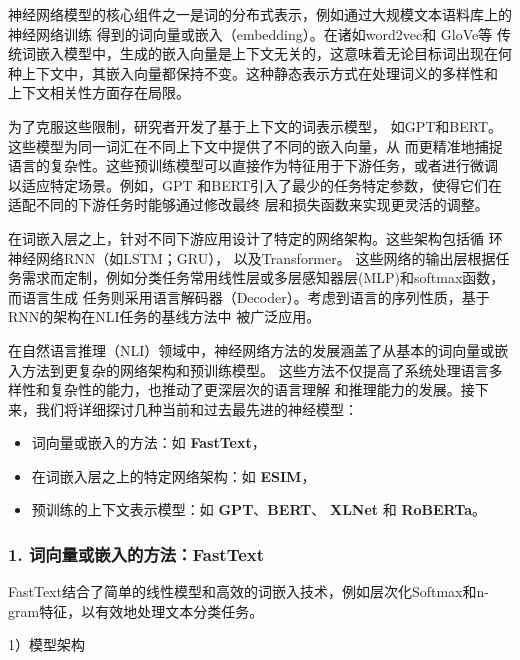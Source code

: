 神经网络模型的核心组件之一是词的分布式表示，例如通过大规模文本语料库上的神经网络训练
得到的词向量或嵌入（embedding）。在诸如word2vec\cite{mikolov2013distributed}和
GloVe\cite{pennington2014glove}等
传统词嵌入模型中，生成的嵌入向量是上下文无关的，这意味着无论目标词出现在何
种上下文中，其嵌入向量都保持不变。这种静态表示方式在处理词义的多样性和
上下文相关性方面存在局限。

为了克服这些限制，研究者开发了基于上下文的词表示模型，
如GPT\cite{radford2018improving}和BERT\cite{devlin2018bert}。
这些模型为同一词汇在不同上下文中提供了不同的嵌入向量，从
而更精准地捕捉语言的复杂性。这些预训练模型可以直接作为特征用于下游任务，或者进行微调
以适应特定场景。例如，GPT
和BERT引入了最少的任务特定参数，使得它们在适配不同的下游任务时能够通过修改最终
层和损失函数来实现更灵活的调整。

在词嵌入层之上，针对不同下游应用设计了特定的网络架构。这些架构包括循
环神经网络RNN（如LSTM\cite{hochreiter1997long}；GRU\cite{cho2014learning}），
以及Transformer\cite{vaswani2017attention}。
这些网络的输出层根据任务需求而定制，例如分类任务常用线性层或多层感知器层(MLP)和softmax函数，而语言生成
任务则采用语言解码器（Decoder）。考虑到语言的序列性质，基于RNN的架构在NLI任务的基线方法中
被广泛应用。

在自然语言推理（NLI）领域中，神经网络方法的发展涵盖了从基本的词向量或嵌入方法到更复杂的网络架构和预训练模型。
这些方法不仅提高了系统处理语言多样性和复杂性的能力，也推动了更深层次的语言理解
和推理能力的发展。接下来，我们将详细探讨几种当前和过去最先进的神经模型：

\begin{itemize}
  \item 词向量或嵌入的方法：如 \textbf{FastText}\cite{joulin2017bag}，
  \item 在词嵌入层之上的特定网络架构：如 \textbf{ESIM}\cite{chen2017enhanced}，
  \item 预训练的上下文表示模型：如 \textbf{GPT}、\textbf{BERT}、
  \textbf{XLNet}\cite{yang2019xlnet} 和 \textbf{RoBERTa}\cite{liu2019roberta}。
\end{itemize}

\subsubsection*{1. 词向量或嵌入的方法：FastText}

FastText结合了简单的线性模型和高效的词嵌入技术，例如层次化Softmax和n-gram特征，以有效地处理文本分类任务。

1）模型架构

